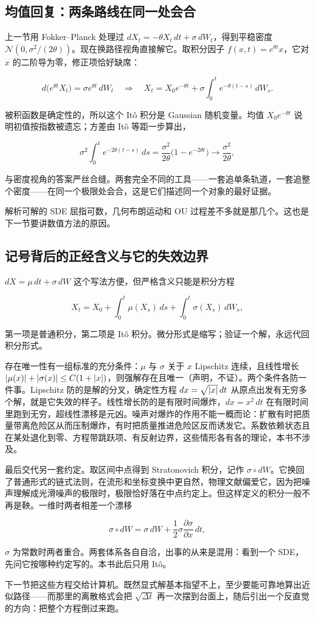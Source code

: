 \subsection{均值回复：两条路线在同一处会合}

上一节用 Fokker--Planck 处理过 \(dX_t=-\theta X_t\,dt+\sigma\,dW_t\)，得到平稳密度 \(\mathcal N(0,\sigma^2/(2\theta))\)。现在换路径视角直接解它。取积分因子 \(f(x,t)=e^{\theta t}x\)，它对 \(x\) 的二阶导为零，修正项恰好缺席：

\[
d\big(e^{\theta t}X_t\big)=\sigma e^{\theta t}\,dW_t
\quad\Longrightarrow\quad
X_t=X_0e^{-\theta t}+\sigma\int_0^te^{-\theta(t-s)}\,dW_s .
\]

被积函数是确定性的，所以这个 Itô 积分是 Gaussian 随机变量。均值 \(X_0e^{-\theta t}\) 说明初值按指数被遗忘；方差由 Itô 等距一步算出，

\[
\sigma^2\int_0^te^{-2\theta(t-s)}\,ds=\frac{\sigma^2}{2\theta}\big(1-e^{-2\theta t}\big)\longrightarrow\frac{\sigma^2}{2\theta},
\]

与密度视角的答案严丝合缝。两套完全不同的工具——一套追单条轨道，一套追整个密度——在同一个极限处会合，这是它们描述同一个对象的最好证据。

解析可解的 SDE 屈指可数，几何布朗运动和 OU 过程差不多就是那几个。这也是下一节要讲数值方法的原因。

\subsection{记号背后的正经含义与它的失效边界}

\(dX=\mu\,dt+\sigma\,dW\) 这个写法方便，但严格含义只能是积分方程

\[
X_t=X_0+\int_0^t\mu(X_s)\,ds+\int_0^t\sigma(X_s)\,dW_s,
\]

第一项是普通积分，第二项是 Itô 积分。微分形式是缩写；验证一个解，永远代回积分形式。

存在唯一性有一组标准的充分条件：\(\mu\) 与 \(\sigma\) 关于 \(x\) Lipschitz 连续，且线性增长 \(\left|\mu(x)\right|+\left|\sigma(x)\right|\le C(1+\left|x\right|)\)，则强解存在且唯一（声明，不证）。两个条件各防一件事。Lipschitz 防的是解的分叉，确定性方程 \(dx=\sqrt{\left|x\right|}\,dt\) 从原点出发有无穷多个解，就是它失效的样子。线性增长防的是有限时间爆炸，\(dx=x^2\,dt\) 在有限时间里跑到无穷，超线性漂移是元凶。噪声对爆炸的作用不能一概而论：扩散有时把质量带离危险区从而压制爆炸，有时把质量推进危险区反而诱发它。系数依赖状态且在某处退化到零、方程带跳跃项、有反射边界，这些情形各有各的理论，本书不涉及。

最后交代另一套约定。取区间中点得到 Stratonovich 积分，记作 \(\sigma\circ dW\)。它换回了普通形式的链式法则，在流形和坐标变换中更自然，物理文献偏爱它，因为把噪声理解成光滑噪声的极限时，极限恰好落在中点约定上。但这样定义的积分一般不再是鞅。一维时两者相差一个漂移

\[
\sigma\circ dW=\sigma\,dW+\frac12\sigma\frac{\partial\sigma}{\partial x}\,dt,
\]

\(\sigma\) 为常数时两者重合。两套体系各自自洽，出事的从来是混用：看到一个 SDE，先问它按哪种约定写的。本书此后只用 Itô。

下一节把这些方程交给计算机。既然显式解基本指望不上，至少要能可靠地算出近似路径——而那里的离散格式会把 \(\sqrt{\Delta t}\) 再一次摆到台面上，随后引出一个反直觉的方向：把整个方程倒过来跑。
